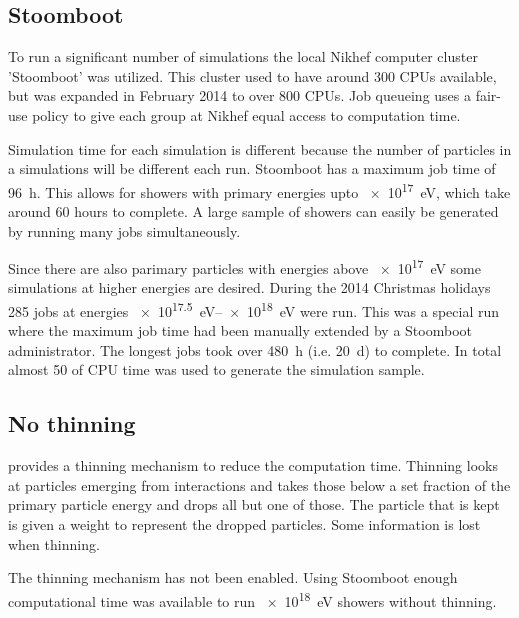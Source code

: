 \subsection{Stoomboot}

To run a significant number of simulations the local Nikhef computer
cluster 'Stoomboot' was utilized. This cluster used to have around 300
CPUs available, but was expanded in February 2014 to over 800 CPUs. Job
queueing uses a fair-use policy to give each group at Nikhef equal
access to computation time.

Simulation time for each simulation is different because the number of
particles in a simulations will be different each run. Stoomboot has a
maximum job time of \SI{96}{\hour}. This allows for showers with primary
energies upto \SI{e17}{\electronvolt}, which take around 60 hours to
complete. A large sample of showers can easily be generated by running
many jobs simultaneously.

Since there are also parimary particles with energies above
\SI{e17}{\electronvolt} some simulations at higher energies are desired.
During the 2014 Christmas holidays 285 jobs at energies
\SIrange{e17.5}{e18}{\electronvolt} were run. This was a special run
where the maximum job time had been manually extended by a Stoomboot
administrator. The longest jobs took over \SI{480}{\hour} (i.e.
\SI{20}{\day}) to complete. In total almost \SI{50}{\year} of CPU time
was used to generate the simulation sample.

\begin{figure} \centering 
\caption{}
\label{fig:simulations_shower_walltime} \end{figure}


\subsection{No thinning}

\corsika provides a thinning mechanism to reduce the computation time.
Thinning looks at particles emerging from interactions and takes those
below a set fraction of the primary particle energy and drops all but
one of those. The particle that is kept is given a weight to represent
the dropped particles. Some information is lost when thinning.

The thinning mechanism has not been enabled. Using Stoomboot enough
computational time was available to run \SI{e18}{\electronvolt} showers
without thinning.

